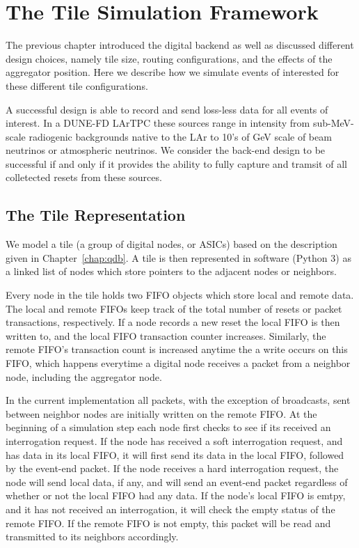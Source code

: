 \section{The Tile Simulation Framework}

The previous chapter introduced the digital backend as well as discussed different design choices, namely tile size, routing configurations, and the effects of the aggregator position.
Here we describe how we simulate events of interested for these different tile configurations.

A successful design is able to record and send loss-less data for all events of interest.
In a DUNE-FD LArTPC these sources range in intensity from sub-MeV-scale radiogenic backgrounds native to the LAr to 10's of GeV scale of beam neutrinos or atmospheric neutrinos.
We consider the back-end design to be successful if and only if it provides the ability to fully capture and tramsit of all colletected resets from these sources.

\subsection{The Tile Representation}

We model a tile (a group of digital nodes, or ASICs) based on the description given in Chapter~\ref{chap:qdb}.
A tile is then represented in software (Python 3) as a linked list of nodes which store pointers to the adjacent nodes or neighbors.

Every node in the tile holds two FIFO objects which store local and remote data. 
The local and remote FIFOs keep track of the total number of resets or packet transactions, respectively.
If a node records a new reset the local FIFO is then written to, and the local FIFO transaction counter increases.
Similarly, the remote FIFO's transaction count is increased anytime the a write occurs on this FIFO, which happens everytime a digital node receives a packet from a neighbor node, including the aggregator node.

In the current implementation all packets, with the exception of broadcasts, sent between neighbor nodes are initially written on the remote FIFO.
At the beginning of a simulation step each node first checks to see if its received an interrogation request.
If the node has received a soft interrogation request, and has data in its local FIFO, it will first send its data in the local FIFO, followed by the event-end packet.
If the node receives a hard interrogation request, the node will send local data, if any, and will send an event-end packet regardless of whether or not the local FIFO had any data.
If the node's local FIFO is emtpy, and it has not received an interrogation, it will check the empty status of the remote FIFO.
If the remote FIFO is not empty, this packet will be read and transmitted to its neighbors accordingly.

